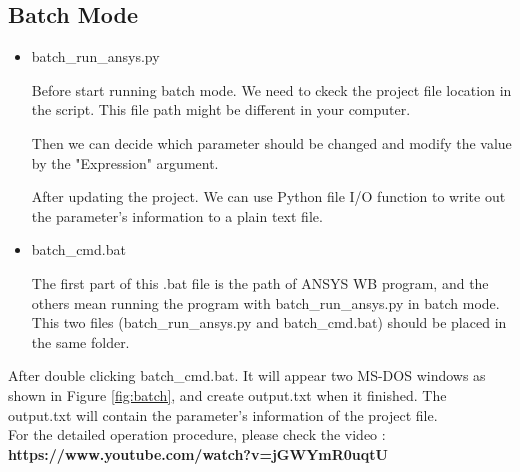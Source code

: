 \documentclass[12pt]{kjleehw}
\begin{document}
\begin{CJK}{UTF8}{bkai}
\subsection{Batch Mode}

\begin{itemize}
  \item batch\_run\_ansys.py

Before start running batch mode. We need to ckeck the project file location in the script. This file path might be different in your computer.



Then we can decide which parameter should be changed and modify the value by the "Expression" argument.



After updating the project. We can use Python file I/O function to write out the parameter's information to a plain text file.



\end{itemize}

\begin{itemize}
  \item batch\_cmd.bat
  

  The first part of this .bat file is the path of ANSYS WB program, and the others mean running the program with batch\_run\_ansys.py in batch mode. This two files (batch\_run\_ansys.py and batch\_cmd.bat) should be placed in the same folder.
\end{itemize}

After double clicking batch\_cmd.bat. It will appear two MS-DOS windows as shown in Figure \ref{fig:batch}, and create output.txt when it finished. The output.txt will contain the parameter's information of the project file. \\

For the detailed operation procedure, please check the video : \\
\textbf{https://www.youtube.com/watch?v=jGWYmR0uqtU}


\end{CJK}
\end{document}
